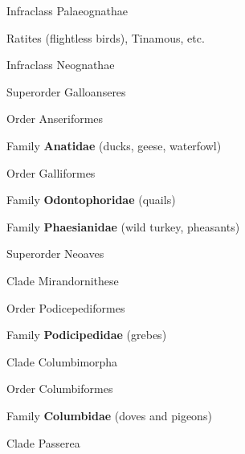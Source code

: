 \documentclass[10pt]{article}
\newlength\mylength
\newcommand*{\growparindent}{\addtolength{\parindent}{\mylength}}
\newcommand*{\reduceparindent}{\addtolength{\parindent}{-1\mylength}}
\begin{document}
\begin{multicols}{2}

\begin{spacing}{1.35}

Infraclass Palaeognathae

  \growparindent
  Ratites (flightless birds), Tinamous, etc.



\reduceparindent
Infraclass Neognathae

  \growparindent
  Superorder Galloanseres

	\growparindent

    Order Anseriformes
     
     	\growparindent
     	
     	Family \textbf{Anatidae} (ducks, geese, waterfowl)
     	
 
    \reduceparindent
    
    Order Galliformes
     
     	\growparindent
     
 	    Family \textbf{Odontophoridae} (quails)
     
     	Family \textbf{Phaesianidae} (wild turkey, pheasants)

 
\reduceparindent

\reduceparindent
Superorder Neoaves
  
  \growparindent
  
	Clade Mirandornithese
	
    \growparindent

		Order Podicepediformes
		
			\growparindent

			Family \textbf{Podicipedidae} (grebes)

	\reduceparindent
	
	\reduceparindent

    Clade Columbimorpha

	\growparindent
	
    Order Columbiformes
    
    	\growparindent
    	
    	Family \textbf{Columbidae} (doves and pigeons)
    	

    \reduceparindent
    
    \reduceparindent

    Clade Passerea
    

\end{spacing}
\end{multicols}
\end{document}
